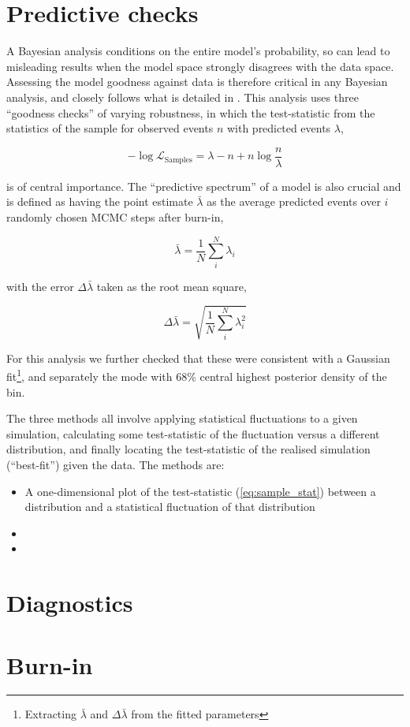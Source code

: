 \section{Predictive checks}
A Bayesian analysis conditions on the entire model's probability, so can lead to misleading results when the model space strongly disagrees with the data space. Assessing the model goodness against data is therefore critical in any Bayesian analysis, and closely follows what is detailed in \cite{posterior_predictive_checks, posterior_predictive_checks2, posterior_predictive_checks3, prior_predictive_checks}. This analysis uses three ``goodness checks'' of varying robustness, in which the test-statistic from the statistics of the sample for observed events $n$ with predicted events $\lambda$,

\begin{equation}
	-\log\mathcal{L}_\text{Samples} = \lambda-n+n\log\frac{n}{\lambda}
	\label{eq:sample_stat}
\end{equation}

is of central importance. The ``predictive spectrum'' of a model is also crucial and is defined as having the point estimate $\bar{\lambda}$ as the average predicted events over $i$ randomly chosen MCMC steps after burn-in,

\begin{equation}
	\bar{\lambda} = \frac{1}{N} \sum^{N}_i \lambda_i
\end{equation}

with the error $\Delta \bar{\lambda}$ taken as the root mean square,

\begin{equation}
	\Delta \bar{\lambda} = \sqrt{\frac{1}{N} \sum^{N}_i \lambda^2_i}
\end{equation}

For this analysis we further checked that these were consistent with a Gaussian fit\footnote{Extracting $\bar{\lambda}$ and $\Delta \bar{\lambda}$ from the fitted parameters}, and separately the mode with 68\% central highest posterior density of the bin.

The three methods all involve applying statistical fluctuations to a given simulation, calculating some test-statistic of the fluctuation versus a different distribution, and finally locating the test-statistic of the realised simulation (``best-fit'') given the data. The methods are:

\begin{itemize} 
	\item A one-dimensional plot of the test-statistic (\autoref{eq:sample_stat}) between a distribution and a statistical fluctuation of that distribution
	\item
	\item
\end{itemize}

\section{Diagnostics}

\section{Burn-in}